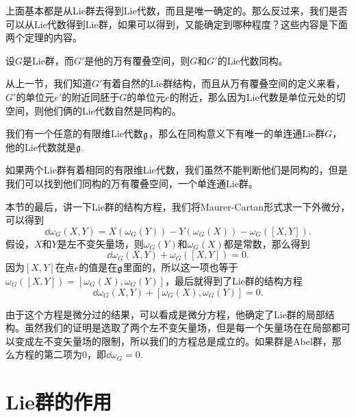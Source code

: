 上面基本都是从Lie群去得到Lie代数，而且是唯一确定的。那么反过来，我们是否可以从Lie代数得到Lie群，如果可以得到，又能确定到哪种程度？这些内容是下面两个定理的内容。

\para 设$G$是Lie群，而$G'$是他的万有覆叠空间，则$G$和$G'$的Lie代数同构。

从上一节，我们知道$G'$有着自然的Lie群结构，而且从万有覆叠空间的定义来看，$G'$的单位元$e'$的附近同胚于$G$的单位元$e$的附近，那么因为Lie代数是单位元处的切空间，则他们俩的Lie代数自然是同构的。

\pro 我们有一个任意的有限维Lie代数${\mathfrak{g}}$，那么在同构意义下有唯一的单连通Lie群$G$，他的Lie代数就是${\mathfrak{g}}$.

如果两个Lie群有着相同的有限维Lie代数，我们虽然不能判断他们是同构的，但是我们可以找到他们同构的万有覆叠空间，一个单连通Lie群。

\para 本节的最后，讲一下Lie群的结构方程，我们将Maurer-Cartan形式求一下外微分，可以得到
\[
\dd \omega_G(X,Y)=X(\omega_G(Y))-Y(\omega_G(X))-\omega_G([X,Y]).
\]
假设，$X$和$Y$是左不变矢量场，则$\omega_G(Y)$和$\omega_G(X)$都是常数，那么得到
\[
\dd \omega_G(X,Y)+\omega_G([X,Y])=0.
\]
因为$[X,Y]$在点$e$的值是在${\mathfrak{g}}$里面的，所以这一项也等于$\omega_G([X,Y])=[\omega_G(X),\omega_G(Y)]$，最后就得到了Lie群的结构方程
\[
\dd \omega_G(X,Y)+[\omega_G(X),\omega_G(Y)]=0.
\]

由于这个方程是微分过的结果，可以看成是微分方程，他确定了Lie群的局部结构。虽然我们的证明是选取了两个左不变矢量场，但是每一个矢量场在在局部都可以变成左不变矢量场的限制，所以我们的方程总是成立的。如果群是Abel群，那么方程的第二项为0，即$\dd \omega_G=0$.

\section{Lie群的作用}





